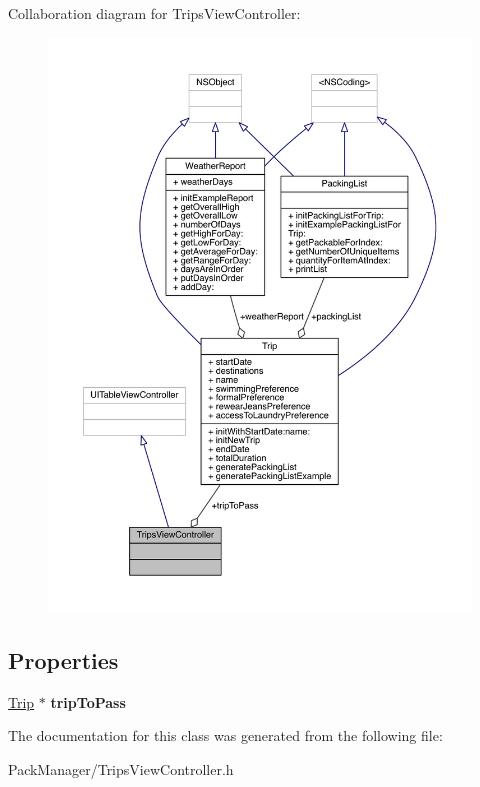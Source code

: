 Collaboration diagram for Trips\-View\-Controller\-:\nopagebreak
\begin{figure}[H]
\begin{center}
\leavevmode
\includegraphics[width=350pt]{interface_trips_view_controller__coll__graph}
\end{center}
\end{figure}
\subsection*{Properties}
\begin{DoxyCompactItemize}
\item 
\hypertarget{interface_trips_view_controller_aefdf3056f500f9c958e6d42ae444bb31}{\hyperlink{interface_trip}{Trip} $\ast$ {\bfseries trip\-To\-Pass}}\label{interface_trips_view_controller_aefdf3056f500f9c958e6d42ae444bb31}

\end{DoxyCompactItemize}


The documentation for this class was generated from the following file\-:\begin{DoxyCompactItemize}
\item 
Pack\-Manager/Trips\-View\-Controller.\-h\end{DoxyCompactItemize}
